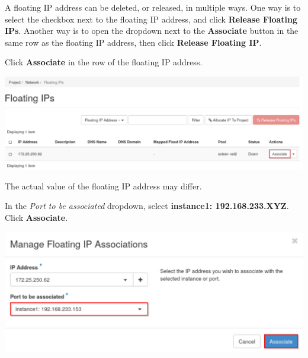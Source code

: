\documentclass[letterpaper, 12pt]{article}
\begin{document}
\begin{enumerate}
    \begin{tipbox}
        A floating IP address can be deleted, or released, in multiple ways.
        One way is to select the checkbox next to the floating IP address, and click \textbf{Release Floating IPs}.
        Another way is to open the dropdown next to the \textbf{Associate} button in the same row as the floating IP address, then click \textbf{Release Floating IP}.
    \end{tipbox}

    \begin{labstep}
        Click \textbf{Associate} in the row of the floating IP address.

        \begin{center}
            \includegraphics[width=\linewidth]{images/part3/step6.png}
        \end{center}
    \end{labstep}

    \begin{notebox}
        The actual value of the floating IP address may differ.
    \end{notebox}

    \begin{labstep}\label{it:floating-ip}
        In the \textit{Port to be associated} dropdown, select \textbf{instance1: 192.168.233.XYZ}.
        Click \textbf{Associate}.

        \begin{center}
            \includegraphics[width=\linewidth]{images/part3/step7.png}
        \end{center}
    \end{labstep}


\end{enumerate}
\end{document}
